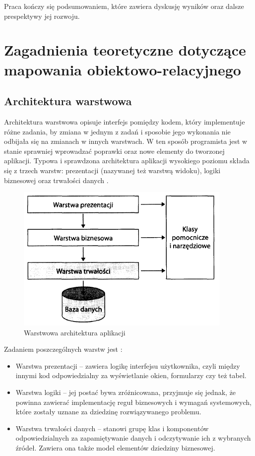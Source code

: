 \documentclass[12pt]{report}
\begin{document}
Praca kończy się podsumowaniem, które zawiera dyskusję wyników oraz dalsze prespektywy jej rozwoju.

\chapter[Zagadnienia teoretyczne]{Zagadnienia teoretyczne dotyczące mapowania obiektowo-relacyjnego} \label{teoria}

\section{Architektura warstwowa}

Architektura warstwowa opisuje interfejs pomiędzy kodem, który implementuje różne zadania, by zmiana w jednym z zadań i sposobie jego wykonania nie odbijała się na
zmianach w innych warstwach. W ten sposób programista jest w stanie sprawniej wprowadzać poprawki oraz nowe elementy do tworzonej aplikacji. Typowa i sprawdzona
architektura aplikacji wysokiego poziomu składa się z trzech warstw: prezentacji (nazywanej też warstwą widoku), logiki biznesowej oraz trwałości danych \cite{hibernate}.

\begin{figure}[h!]
\centering
\includegraphics[width=.6\textwidth]{resources/layers.png}
\caption[Warstwowa architektura aplikacji]{Warstwowa architektura aplikacji \cite{hibernate}}
\end{figure}

Zadaniem poszczególnych warstw jest \cite{hibernate}:

\begin{itemize}
\item Warstwa prezentacji -- zawiera logikę interfejsu użytkownika, czyli między innymi kod odpowiedzialny za wyświetlanie okien, formularzy czy też tabel.
\item Warstwa logiki -- jej postać bywa zróżnicowana, przyjmuje się jednak, że powinna zawierać implementację reguł biznesowych i wymagań systemowych, które
zostały uznane za dziedzinę rozwiązywanego problemu.
\item Warstwa trwałości danych -- stanowi grupę klas i komponentów odpowiedzialnych za zapamiętywanie danych i odczytywanie ich z wybranych źródeł. Zawiera ona także
model elementów dziedziny biznesowej.
\end{itemize}
\end{document}
